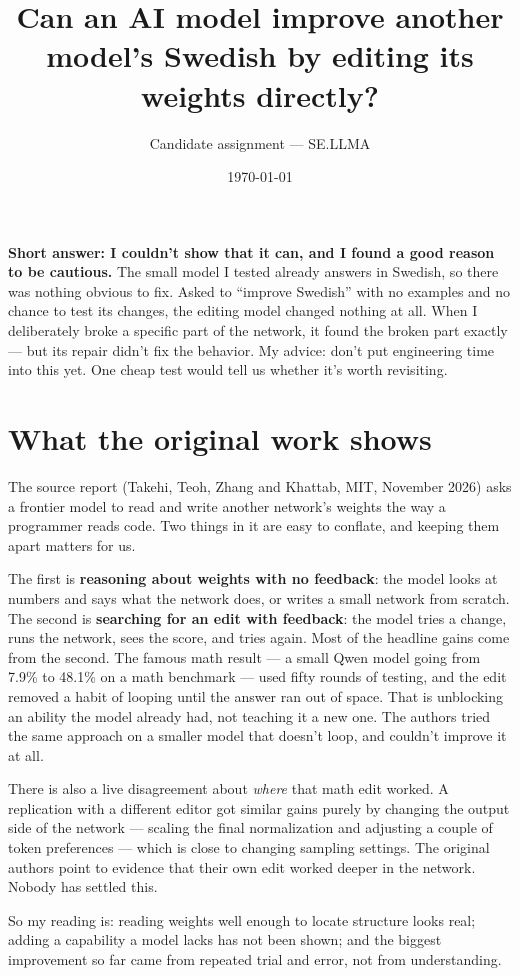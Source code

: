 \documentclass[11pt]{article}
\title{Can an AI model improve another model's Swedish by editing its weights directly?}
\author{Candidate assignment --- SE.LLMA}
\date{\today}
\begin{document}
\maketitle

\textbf{Short answer: I couldn't show that it can, and I found a good reason to be cautious.}
The small model I tested already answers in Swedish, so there was nothing obvious to fix.
Asked to ``improve Swedish'' with no examples and no chance to test its changes, the editing
model changed nothing at all. When I deliberately broke a specific part of the network, it
found the broken part exactly --- but its repair didn't fix the behavior. My advice: don't
put engineering time into this yet. One cheap test would tell us whether it's worth
revisiting.

\section{What the original work shows}

The source report (Takehi, Teoh, Zhang and Khattab, MIT, November 2026) asks a frontier
model to read and write another network's weights the way a programmer reads code. Two
things in it are easy to conflate, and keeping them apart matters for us.

The first is \textbf{reasoning about weights with no feedback}: the model looks at numbers
and says what the network does, or writes a small network from scratch. The second is
\textbf{searching for an edit with feedback}: the model tries a change, runs the network,
sees the score, and tries again. Most of the headline gains come from the second. The
famous math result --- a small Qwen model going from 7.9\% to 48.1\% on a math benchmark
--- used fifty rounds of testing, and the edit removed a habit of looping until the answer
ran out of space. That is unblocking an ability the model already had, not teaching it a
new one. The authors tried the same approach on a smaller model that doesn't loop, and
couldn't improve it at all.

There is also a live disagreement about \emph{where} that math edit worked. A replication
with a different editor got similar gains purely by changing the output side of the network
--- scaling the final normalization and adjusting a couple of token preferences --- which is
close to changing sampling settings. The original authors point to evidence that their own
edit worked deeper in the network. Nobody has settled this.

So my reading is: reading weights well enough to locate structure looks real; adding a
capability a model lacks has not been shown; and the biggest improvement so far came from
repeated trial and error, not from understanding.
\end{document}
